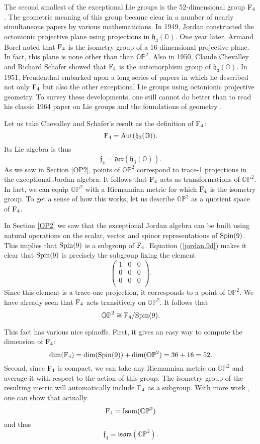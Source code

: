 \documentclass[12pt]{article}
\renewcommand\O{{\mathbb O}}
\newcommand\OP{{\mathbb {OP}}}
\newcommand{\Spin}{{\rm Spin}}
\newcommand{\F}{{\rm F}}
\newcommand{\f}{{\mathfrak {f}}}
\newcommand{\h}{{\mathfrak {h}}}
\newcommand{\isom}{{\mathfrak {isom}}}
\newcommand{\Isom}{{\rm Isom}}
\newcommand{\Der}{{\mathfrak {der}}}
\newcommand{\Aut}{{\rm Aut}}
\newcommand{\iso}{\cong}
\newcommand{\be}{\begin{equation}}
\newcommand{\ee}{\end{equation}}
\begin{document}
The second smallest of the exceptional Lie groups is the 52-dimensional
group $\F_4$.  The geometric meaning of this group became clear in a
number of nearly simultaneous papers by various mathematicians.  In
1949, Jordan constructed the octonionic projective plane using
projections in $\h_3(\O)$.   One year later, Armand Borel \cite{Borel}
noted that $\F_4$ is the isometry group of a 16-dimensional projective
plane.  In fact, this plane is none other than than $\OP^2$.   Also
in 1950, Claude Chevalley and Richard Schafer \cite{CS} showed that
$\F_4$ is the automorphism group of $\h_3(\O)$.   In 1951, Freudenthal
\cite{Freudenthal4} embarked upon a long series of papers in which he
described not only $\F_4$ but also the other exceptional Lie groups
using octonionic projective geometry.  To survey these developments, one
still cannot do better than to read his classic 1964 paper on Lie groups
and the foundations of geometry \cite{Freudenthal3}.

Let us take Chevalley and Schafer's result as the definition of $\F_4$:
\[     \F_4 = \Aut(\h_3(\O))  .\]
Its Lie algebra is thus
\[   \f_4 = \Der(\h_3(\O)).     \label{f4.1}  \]
As we saw in Section \ref{OP2}, points of $\OP^2$ correspond to trace-1
projections in the exceptional Jordan algebra.  It follows that $\F_4$
acts as transformations of $\OP^2$.  In fact, we can equip $\OP^2$ with
a Riemannian metric for which $\F_4$ is the isometry group. To get a
sense of how this works, let us describe $\OP^2$ as a quotient space of
$\F_4$.   

In Section \ref{OP2} we saw that the exceptional Jordan algebra can
be built using natural operations on the scalar, vector and spinor
representations of $\Spin(9)$.  This implies that $\Spin(9)$ is a
subgroup of $\F_4$.  Equation (\ref{jordan.9d}) makes it clear that
$\Spin(9)$ is precisely the subgroup fixing the element
 \[   \left( \begin{array}{ccc} 1 & 0 & 0 \\  
                                0 & 0 & 0 \\  
                                0 & 0 & 0 \\  
\end{array} \right).  \]  
Since this element is a trace-one projection, it corresponds to a point
of $\OP^2$.  We have already seen that $\F_4$ acts transitively on 
$\OP^2$.  It follows that
\be     \OP^2 \iso \F_4 /\Spin(9)  . \label{F4/Spin(9)} \ee
  
This fact has various nice spinoffs.  First, it gives an easy way to  
compute the dimension of $\F_4$:  
\[    \dim(\F_4) = \dim(\Spin(9)) + \dim(\OP^2) =  
36 + 16 = 52.\]  
Second, since $\F_4$ is compact, we can take any Riemannian metric on $\OP^2$ 
and average it with respect to the action of this group.  The isometry
group of the resulting metric will automatically include $\F_4$ as a
subgroup.  With more work \cite{Besse}, one can show that actually
\[     \F_4 = \Isom(\OP^2) \]
and thus
\[   \f_4 = \isom(\OP^2).     \label{f4.2}  \]
\end{document}
